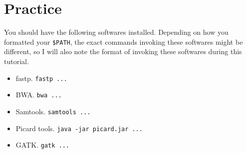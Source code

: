 \documentclass[12pt,letterpaper]{article}
\begin{document}
\section{Practice}

You should have the following softwares installed. Depending on how you formatted your \texttt{\$PATH}, the exact commands invoking these softwares might be different, so I will also note the format of invoking these softwares during this tutorial.

\begin{itemize}
   \item fastp. \texttt{fastp ...}
   \item BWA. \texttt{bwa ...}
   \item Samtools. \texttt{samtools ...}
   \item Picard tools. \texttt{java -jar picard.jar ...}
   \item GATK. \texttt{gatk ...}
\end{itemize}
\end{document}
